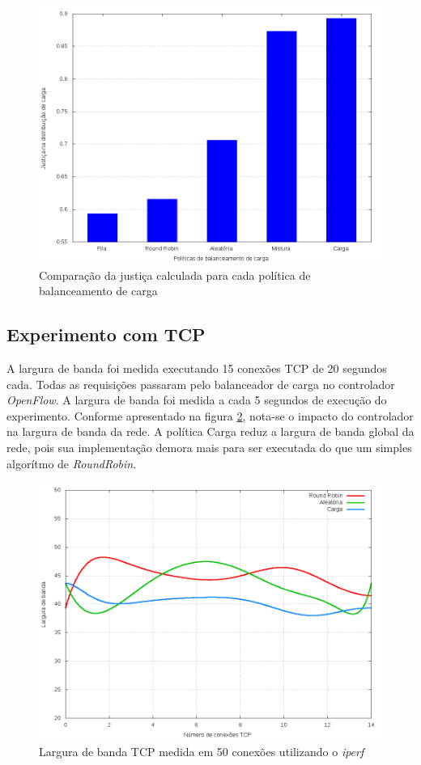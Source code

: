 \begin{figure}[htb!]
    \centering
    \includegraphics[width=0.9\linewidth]{img/balancer-fairness}
    \caption{Comparação da justiça calculada para cada política de
    balanceamento de carga}
    \label{fig:fainess}
\end{figure}


\subsection{Experimento com TCP}
A largura de banda foi medida executando 15 conexões TCP de 20 segundos cada.
Todas as requisições passaram pelo balanceador de carga no controlador 
\emph{OpenFlow}.
A largura de banda foi medida a cada 5 segundos de execução do experimento.
Conforme apresentado na figura \ref{fig:balancer-tcp-bandwidth}, nota-se o 
impacto do controlador na largura de banda da rede.
A política Carga reduz a largura de banda global da rede, pois sua 
implementação demora mais para ser executada do que um simples algorítmo 
de \emph{RoundRobin}.

\begin{figure}[htb!]
    \centering
    \includegraphics[width=\linewidth]{img/balancer-tcp-bandwidth}
    \caption{Largura de banda TCP medida em 50 conexões utilizando o 
    \emph{iperf}}
    \label{fig:balancer-tcp-bandwidth}
\end{figure}

